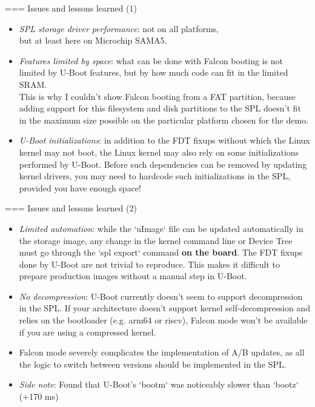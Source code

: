 === {Issues and lessons learned (1)}
   \begin{itemize}
      \item {\em SPL storage driver performance}: not on all platforms,\\
	    but at least here on Microchip SAMA5.
      \item {\em Features limited by space}: what can be done with
            Falcon booting is not limited by U-Boot features, but by how much code
	    can fit in the limited SRAM.\\
	    This is why I couldn't show Falcon booting from a FAT
            partition, because adding support for this filesystem and disk partitions to
	    the SPL doesn't fit in the maximum size possible on the particular
	    platform chosen for the demo.
      \item {\em U-Boot initializations}: in addition to the FDT fixups without which
            the Linux kernel may not boot, the Linux kernel may also rely on some
            initializations performed by U-Boot. Before such dependencies
	    can be removed by updating kernel drivers, you may need to
	    hardcode such initializations in the SPL, provided you have enough
	    space!
   \end{itemize}


=== {Issues and lessons learned (2)}
   \begin{itemize}
      \item {\em Limited automation}: while the `uImage` file can be updated
            automatically in the storage image, any change in the kernel
	    command line or Device Tree must go through the `spl export` command
            {\bf on the board}. The FDT fixups done by U-Boot are not trivial to
            reproduce. This makes it difficult to prepare production images without a
            manual step in U-Boot.
      \item {\em No decompression}: U-Boot currently doesn't seem to
	    support decompression in the SPL. If your architecture
            doesn't support kernel self-decompression and relies on the bootloader
	    (e.g. arm64 or riscv), Falcon mode won't be available if you are using
	    a compressed kernel.
      \item Falcon mode severely complicates the implementation of A/B updates,
	    as all the logic to switch between versions should be implemented
	    in the SPL.
      \item {\em Side note}: Found that U-Boot's `bootm` was
	    noticeably slower than `bootz` (+170 ms)
   \end{itemize}


